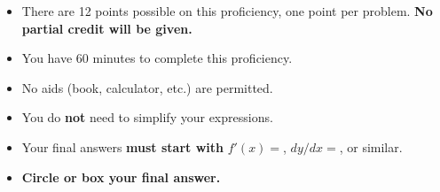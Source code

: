 \documentclass[12pt]{article}
\begin{document}
\begin{itemize}
\addtolength\itemsep{-1mm}
\item There are 12 points possible on this proficiency, one point per problem. {\bf No partial credit will be given.}

\item You have 60 minutes to complete this proficiency.

\item No aids (book, calculator, etc.) are permitted.  

\item You do \textbf{not} need to simplify your expressions.



\item Your final answers \textbf{must start with} $f'(x)=$, $dy/dx=$, or similar.

\item {\bf Circle or box your final answer.}
\end{itemize}
\end{document}
